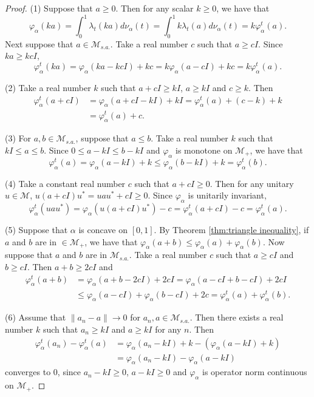 \documentclass[a4paper,12pt]{amsart}
\newcommand{\M}{\mathcal{M}}
\begin{document}
\begin{proof}
(1) Suppose that $a \geq 0$. Then for any scalar $k \geq 0$, we have that
$$
\varphi_{\alpha}(ka) = \int_0^1 \lambda_t(ka) d\nu_{\alpha}(t) 
=\int_0^1 k \lambda_t(a) d\nu_{\alpha}(t) = k \varphi_{\alpha}^{t}(a).
$$
Next suppose that $a \in  {\M}_{s.a.}$. Take a real number $c$ such that $a \geq cI$.  Since $ka \geq kcI$, 
$$
\varphi_{\alpha}^{t}(ka) =\varphi_{\alpha}(ka -kcI) + kc = k\varphi_{\alpha}(a -cI) + kc = k\varphi_{\alpha}^{t}(a).
$$

(2) Take a real number $k$ such that $a + cI \geq kI$, $a \geq kI$ and $c \geq k$.  Then
\begin{align*}
\varphi_{\alpha}^{t}(a + cI) & = \varphi_{\alpha}(a + cI -kI) + kI 
        =  \varphi_{\alpha}^t(a)  + (c-k) + k \\
     & = \varphi_{\alpha}^t(a)  + c.
\end{align*}

(3) For $a, b \in {\M}_{s.a.}$, suppose that $a \leq b$.  Take a real number $k$ such that $kI \leq a \leq b$.  
Since $0 \leq a -kI \leq b -kI$ and $\varphi_{\alpha}$ is monotone on $\M_+$, we have that 
$$
 \varphi_{\alpha}^t(a) = \varphi_{\alpha}(a -kI) + k \leq \varphi_{\alpha}(b -kI) + k = \varphi_{\alpha}^t(b).  
$$

(4) Take a constant real number $c$ such that $a + cI \geq 0$.  Then for any unitary $u \in  {\M}$, 
$u(a + cI)u^* = uau^* + cI \geq 0$.  Since $\varphi_{\alpha}$ is unitarily invariant, 
$$
\varphi_{\alpha}^{t}(uau^*) = \varphi_{\alpha}(u(a + cI)u^*) - c 
=  \varphi_{\alpha}^{t}(a + cI) -c = \varphi_{\alpha}^t(a).   
 $$

(5) Suppose that $\alpha$ is concave on $[0,1]$.  By Theorem \ref{thm:triangle inequality}, 
if  $a$ and $b$ are in $\in {\M}_{+}$, we have that 
$ \varphi_{\alpha}(a + b) \leq  \varphi_{\alpha}(a) + \varphi_{\alpha}(b). $  
Now suppose that $a$ and $b$ are  in ${\M}_{s.a.}$.  Take a real number $c$ such that $a \geq cI$ and $b \geq cI$.  
Then  $a + b \geq 2cI$ and 
\begin{align*}
\varphi_{\alpha}^{t}(a + b) & = \varphi_{\alpha}(a + b -2cI) + 2cI = \varphi_{\alpha}(a -cI + b-cI) + 2cI \\
 &\leq  \varphi_{\alpha}(a - cI)  + \varphi_{\alpha}(b - cI) +2c = \varphi_{\alpha}^{t}(a) + \varphi_{\alpha}^{t}(b). 
\end{align*}
 
(6) Assume that $\|a_n - a\| \rightarrow 0$ for $a_n, a \in {\M}_{s.a.}$. 
Then there exists a real number $k$ such that $a_n \geq kI$ and $a \geq kI$ for any $n$. Then 
\begin{align*}
\varphi_{\alpha}^{t}(a_n) - \varphi_{\alpha}^{t}(a) & =  \varphi_{\alpha}(a_n -kI) + k - (\varphi_{\alpha}(a -kI) +k)  \\
 & = \varphi_{\alpha}(a_n -kI) - \varphi_{\alpha}(a -kI) 
\end{align*}
converges to $0$, since $a_n - kI \geq 0$,  $a - kI \geq 0$ and  $\varphi_{\alpha}$ is operator norm continuous on $\M_+$. 
\end{proof}
\end{document}

